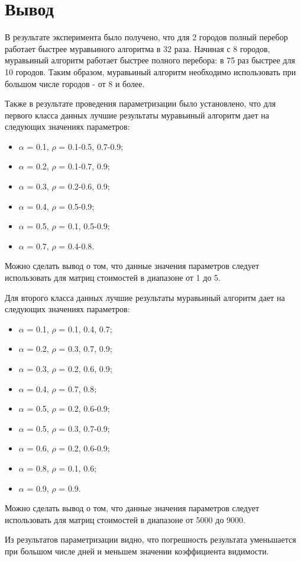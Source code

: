 \section*{Вывод}

В результате эксперимента было получено, что для 2 городов полный перебор работает быстрее муравьиного алгоритма в 32 раза. Начиная с 8 городов, муравьиный алгоритм работает быстрее полного перебора: в 75 раз быстрее для 10 городов. Таким образом, муравьиный алгоритм необходимо использовать при большом числе городов - от 8 и более.

Также в результате проведения параметризации было установлено, что для первого класса данных лучшие результаты муравьиный алгоритм дает на следующих значениях параметров:
\begin{itemize}
	\item $\alpha$ = 0.1, $\rho$ = 0.1-0.5, 0.7-0.9;
	\item $\alpha$ = 0.2, $\rho$ = 0.1-0.7, 0.9;
	\item $\alpha$ = 0.3, $\rho$ = 0.2-0.6, 0.9;
	\item $\alpha$ = 0.4, $\rho$ = 0.5-0.9;
	\item $\alpha$ = 0.5, $\rho$ = 0.1, 0.5-0.9;
	\item $\alpha$ = 0.7, $\rho$ = 0.4-0.8.
\end{itemize}

Можно сделать вывод о том, что данные значения параметров следует использовать для матриц стоимостей в диапазоне от 1 до 5.

Для второго класса данных лучшие результаты муравьиный алгоритм дает на следующих значениях параметров:
\begin{itemize}
	\item $\alpha$ = 0.1, $\rho$ = 0.1, 0.4, 0.7;
	\item $\alpha$ = 0.2, $\rho$ = 0.3, 0.7, 0.9;
	\item $\alpha$ = 0.3, $\rho$ = 0.2, 0.6, 0.9;
	\item $\alpha$ = 0.4, $\rho$ = 0.7, 0.8;
	\item $\alpha$ = 0.5, $\rho$ = 0.2, 0.6-0.9;
	\item $\alpha$ = 0.5, $\rho$ = 0.3, 0.7-0.9;
	\item $\alpha$ = 0.6, $\rho$ = 0.2, 0.6-0.9;
	\item $\alpha$ = 0.8, $\rho$ = 0.1, 0.6;
	\item $\alpha$ = 0.9, $\rho$ = 0.9.
\end{itemize}

Можно сделать вывод о том, что данные значения параметров следует использовать для матриц стоимостей в диапазоне от 5000 до 9000.

Из результатов параметризации видно, что погрешность результата уменьшается при большом числе дней и меньшем значении коэффициента видимости.